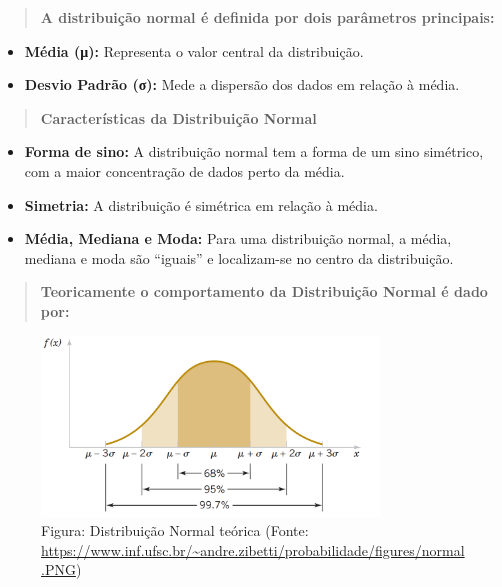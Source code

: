 \documentclass[
]{book}
\providecommand{\tightlist}{%
  \setlength{\itemsep}{0pt}\setlength{\parskip}{0pt}}
\begin{document}
\begin{quote}
\textbf{A distribuição normal é definida por dois parâmetros principais:}
\end{quote}

\begin{itemize}
\tightlist
\item
  \textbf{Média (μ):} Representa o valor central da distribuição.
\item
  \textbf{Desvio Padrão (σ):} Mede a dispersão dos dados em relação à média.
\end{itemize}

\begin{quote}
\textbf{Características da Distribuição Normal}
\end{quote}

\begin{itemize}
\tightlist
\item
  \textbf{Forma de sino:} A distribuição normal tem a forma de um sino simétrico, com a maior concentração de dados perto da média.
\item
  \textbf{Simetria:} A distribuição é simétrica em relação à média.
\item
  \textbf{Média, Mediana e Moda:} Para uma distribuição normal, a média, mediana e moda são ``iguais'' e localizam-se no centro da distribuição.
\end{itemize}

\begin{quote}
\textbf{Teoricamente o comportamento da Distribuição Normal é dado por:}
\end{quote}

\begin{figure}
\centering
\includegraphics[width=0.8\textwidth,height=\textheight]{normalTeorica.png}
\caption{Figura: Distribuição Normal teórica (Fonte: \url{https://www.inf.ufsc.br/~andre.zibetti/probabilidade/figures/normal.PNG})}
\end{figure}
\end{document}
